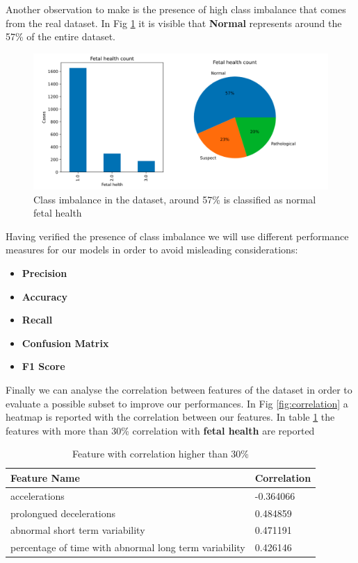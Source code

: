 \documentclass[a4paper,12pt]{article}
\begin{document}
\noindent Another observation to make is the presence of high class imbalance that comes from the real dataset. In Fig \ref{fig:imbalance} it is visible that \textbf{Normal} represents around the 57\% of the entire dataset.

\begin{figure}[H]
\begin{center}
\includegraphics[width=1.0\textwidth]{images/imbalance.png}
\end{center}
\caption{Class imbalance in the dataset, around 57\% is classified as normal fetal health}
\label{fig:imbalance}
\end{figure}

\noindent Having verified the presence of class imbalance we will use different performance measures for our models in order to avoid misleading considerations:
\bigbreak
\begin{itemize}
  \item \textbf{Precision}
  \item \textbf{Accuracy}
  \item \textbf{Recall}
  \item \textbf{Confusion Matrix}
  \item \textbf{F1 Score}
\end{itemize}

\bigbreak
\noindent Finally we can analyse the correlation between features of the dataset in order to evaluate a possible subset to improve our performances.
In Fig \ref{fig:correlation} a heatmap is reported with the correlation between our features. In table \ref{tab:correlation} the features with more than 30\% correlation with \textbf{fetal health} are reported

\begin{table}[H]
\begin{tabular}{ |p{10cm}||p{3cm}| }
  \hline
  Feature Name& Correlation \\
  \hline
  accelerations&                                            -0.364066\\
  prolongued decelerations&                                  0.484859\\
  abnormal short term variability&                           0.471191\\
  percentage of time with abnormal long term variability&    0.426146\\
  \hline
\end{tabular}
\caption{Feature with correlation higher than 30\%}
\label{tab:correlation}
\end{table}
\end{document}
